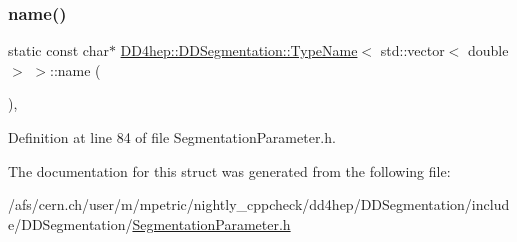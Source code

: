 \subsubsection{\texorpdfstring{name()}{name()}}
{\footnotesize\ttfamily static const char$\ast$ \hyperlink{struct_d_d4hep_1_1_d_d_segmentation_1_1_type_name}{D\+D4hep\+::\+D\+D\+Segmentation\+::\+Type\+Name}$<$ std\+::vector$<$ double $>$ $>$\+::name (\begin{DoxyParamCaption}{ }\end{DoxyParamCaption})\hspace{0.3cm}{\ttfamily [inline]}, {\ttfamily [static]}}



Definition at line 84 of file Segmentation\+Parameter.\+h.



The documentation for this struct was generated from the following file\+:\begin{DoxyCompactItemize}
\item 
/afs/cern.\+ch/user/m/mpetric/nightly\+\_\+cppcheck/dd4hep/\+D\+D\+Segmentation/include/\+D\+D\+Segmentation/\hyperlink{_segmentation_parameter_8h}{Segmentation\+Parameter.\+h}\end{DoxyCompactItemize}
